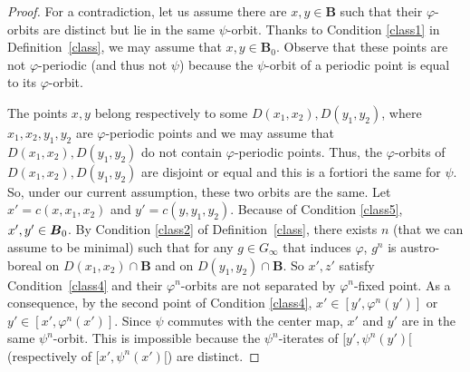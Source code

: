 \documentclass[JEP,XML,SOM,Unicode,NoFloatCountersInSection]{cedram}
\theoremstyle{plain}
\theoremstyle{definition}
\newcommand{\bB}{{\boldsymbol{B}}}
\begin{document}
\begin{proof} For a contradiction, let us assume there are $x,y\in\bB$ such that their $\varphi$-orbits are distinct but lie in the same $\psi$-orbit. Thanks to Condition \eqref{class1} in Definition~\ref{class}, we may assume that $x,y\in \bB_0$. Observe that these points are not $\varphi$-periodic (and thus not $\psi$) because the $\psi$-orbit of a periodic point is equal to its $\varphi$-orbit.

The points $x,y$ belong respectively to some $D(x_1,x_2),D(y_1,y_2)$, where $x_1,x_2,y_1,y_2$ are $\varphi$-periodic points and we may assume that $D(x_1,x_2),D(y_1,y_2)$ do not contain $\varphi$\nobreakdash-periodic points. Thus, the $\varphi$-orbits of $D(x_1,x_2),D(y_1,y_2)$ are disjoint or equal and this is a fortiori the same for $\psi$. So, under our current assumption, these two orbits are the same. Let $x'=c(x,x_1,x_2)$ and $y'=c(y,y_1,y_2)$. Because of Condition \eqref{class5}, $x', y'\in\nobreak\bB_0$. By Condition \eqref{class2} of Definition~\ref{class}, there exists $n$ (that we can assume to be minimal) such that for any $g\in G_\infty$ that induces $\varphi$, $g^n$ is austro-boreal on $D(x_1,x_2)\cap\bB$ and on $D(y_1,y_2)\cap\bB$. So $x',z'$ satisfy Condition~\eqref{class4} and their $\varphi^n$\nobreakdash-orbits are not separated by $\varphi^n$-fixed point. As a consequence, by the second point of Condition \eqref{class4}, $x'\in[y',\varphi^{n}(y')]$ or $y'\in[x',\varphi^{n}(x')]$. Since $\psi$ commutes with the center map, $x'$ and $y'$ are in the same $\psi^n$-orbit. This is impossible because the $\psi^n$-iterates of $[y',\psi^n(y')[$ (respectively of $[x',\psi^n(x')[$) are distinct.
\end{proof}
\end{document}
